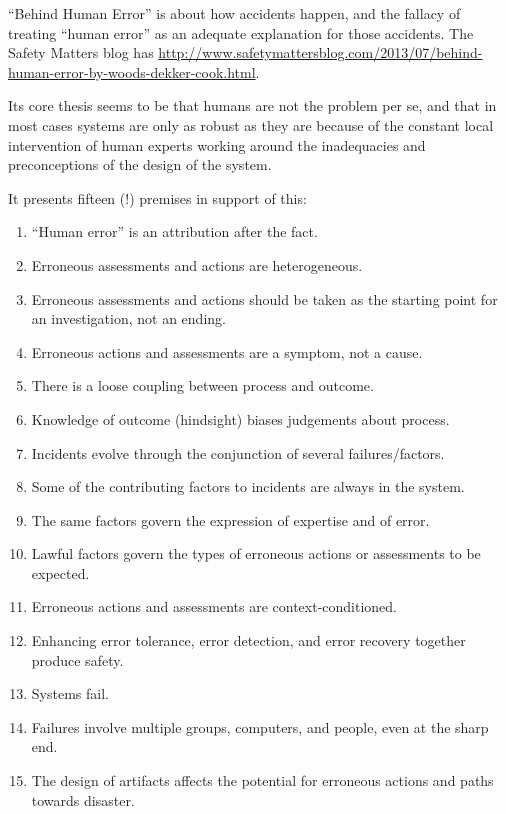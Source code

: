 ``Behind Human Error'' is about how accidents happen,
and the fallacy of treating ``human error'' as an adequate explanation for those accidents.
The Safety Matters blog has \href{a good review of this book}{http://www.safetymattersblog.com/2013/07/behind-human-error-by-woods-dekker-cook.html}.

Its core thesis seems to be that humans are not the problem per se,
and that in most cases systems are only as robust as they are because of the constant local intervention of human experts working around the inadequacies and preconceptions of the design of the system.

It presents fifteen (!) premises in support of this:

\begin{enumerate}
\item ``Human error'' is an attribution after the fact.
\item Erroneous assessments and actions are heterogeneous.
\item Erroneous assessments and actions should be taken as the starting point for an investigation, not an ending.
\item Erroneous actions and assessments are a symptom, not a cause.
\item There is a loose coupling between process and outcome.
\item Knowledge of outcome (hindsight) biases judgements about process.
\item Incidents evolve through the conjunction of several failures/factors.
\item Some of the contributing factors to incidents are always in the system.
\item The same factors govern the expression of expertise and of error.
\item Lawful factors govern the types of erroneous actions or assessments to be expected.
\item Erroneous actions and assessments are context-conditioned.
\item Enhancing error tolerance, error detection, and error recovery together produce safety.
\item Systems fail.
\item Failures involve multiple groups, computers, and people, even at the sharp end.
\item The design of artifacts affects the potential for erroneous actions and paths towards disaster.
\end{enumerate}

